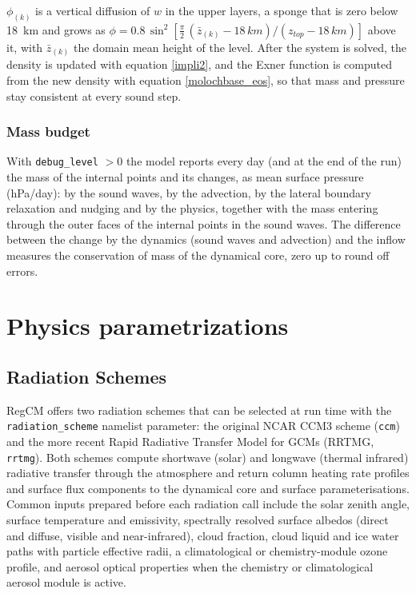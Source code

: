 $\phi_{(k)}$ is a vertical diffusion of $w$ in the upper layers, a sponge
that is zero below 18~km and grows as
$\phi = 0.8\,\sin^2\left[\frac{\pi}{2}\,(\bar{z}_{(k)} - 18\,km)/
(z_{top} - 18\,km)\right]$ above it, with $\bar{z}_{(k)}$ the domain mean
height of the level. After the system is solved, the density is updated with
equation \ref{impli2}, and the Exner function is computed from the new density
with equation \ref{molochbase_eos}, so that mass and pressure stay consistent
at every sound step.

\subsubsection{Mass budget}

With \texttt{debug\_level} $> 0$ the model reports every day (and at the end
of the run) the mass of the internal points and its changes, as mean surface
pressure (hPa/day): by the sound waves, by the advection, by the lateral
boundary relaxation and nudging and by the physics, together with the mass
entering through the outer faces of the internal points in the sound waves.
The difference between the change by the dynamics (sound waves and
advection) and the inflow measures the conservation of mass of the
dynamical core, zero up to round off errors.

\section{Physics parametrizations} \label{sec:physics}

\subsection{Radiation Schemes}

RegCM offers two radiation schemes that can be selected at run time with the
\texttt{radiation\_scheme} namelist parameter: the original \ac{NCAR} CCM3
scheme (\texttt{ccm}) and the more recent Rapid Radiative Transfer Model for
GCMs (RRTMG, \texttt{rrtmg}).  Both schemes compute shortwave (solar) and longwave
(thermal infrared) radiative transfer through the atmosphere and return
column heating rate profiles and surface flux components to the dynamical
core and surface parameterisations.  Common inputs prepared before each
radiation call include the solar zenith angle, surface temperature and
emissivity, spectrally resolved surface albedos (direct and diffuse, visible
and near-infrared), cloud fraction, cloud liquid and ice water paths with
particle effective radii, a climatological or chemistry-module ozone profile,
and aerosol optical properties when the chemistry or climatological aerosol
module is active.

